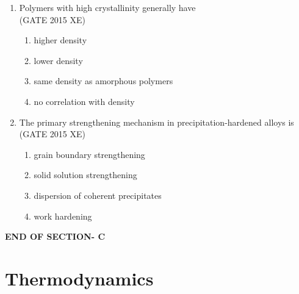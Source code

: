 \documentclass[journal,12pt,onecolumn]{IEEEtran}
\begin{document}
\begin{enumerate}
\item Polymers with high crystallinity generally have  \\
\hfill{(GATE 2015 XE)}
\begin{multicols}{2}
\begin{enumerate}
\item higher density
\item lower density
\item same density as amorphous polymers
\item no correlation with density
\end{enumerate}
\end{multicols}

\item The primary strengthening mechanism in precipitation-hardened alloys is\\
\hfill{(GATE 2015 XE)}
\begin{multicols}{2}
\begin{enumerate}
\item grain boundary strengthening
\item solid solution strengthening
\item dispersion of coherent precipitates
\item work hardening
\end{enumerate}
\end{multicols}


\end{enumerate}

\vspace{3\baselineskip}
\begin{center}
    \item[\textbf{END OF SECTION- C}]
\end{center}


\newpage
\section*{Thermodynamics}
\bigskip
\end{document}
